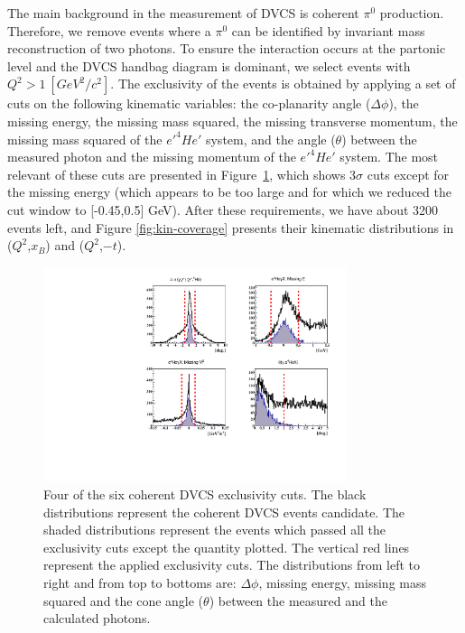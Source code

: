 \documentclass[preprint,nofootinbib,showpacs,prl,superscriptaddress,secnumarabic,amssymb,nobibnotes,aps,floatfix]{revtex4}
\begin{document}
The main background in the measurement of DVCS is coherent $\pi^{0}$ 
production. Therefore, we remove events where a $\pi^{0}$ can be identified by 
invariant mass reconstruction of two photons.  To ensure the interaction 
occurs at the partonic level and the DVCS handbag diagram is dominant, we 
select events with $Q^{2}>1~[GeV^{2}/c^{2}]$. The exclusivity of the events is 
obtained by applying a set of cuts on the following kinematic variables: the 
co-planarity angle ($\Delta \phi$), the missing energy, the missing mass 
squared, the missing transverse momentum, the missing mass squared of the 
$e'^4He'$ system, and the angle ($\theta$) between the measured photon and the 
missing momentum of the $e'^4He'$ system. The most relevant of these cuts are 
presented in Figure~\ref{fig:kin-cuts}, which shows 3$\sigma$ cuts except for the 
missing energy (which appears to be too large and for which we reduced the cut 
window to [-0.45,0.5] GeV). After these requirements, we have about 3200 events 
left, and Figure \ref{fig:kin-coverage} presents their
kinematic distributions in ($Q^{2}$,$x_{B}$) and ($Q^{2}$,$-t$).

\begin{figure}[tb]
\includegraphics[width=8.9cm]{figs/coh_exc_cuts.pdf}
\caption{Four of the six coherent DVCS exclusivity cuts. The black 
distributions represent the coherent DVCS events candidate. The shaded 
distributions represent the events which passed all the exclusivity cuts except 
the quantity plotted. The vertical red lines represent the applied exclusivity 
cuts. The distributions from left to right and from top to bottoms are: $\Delta 
\phi$, missing energy, missing mass squared and the cone angle ($\theta$) 
between the measured and the calculated photons.}
\label{fig:kin-cuts}
\end{figure}
 
\end{document}
